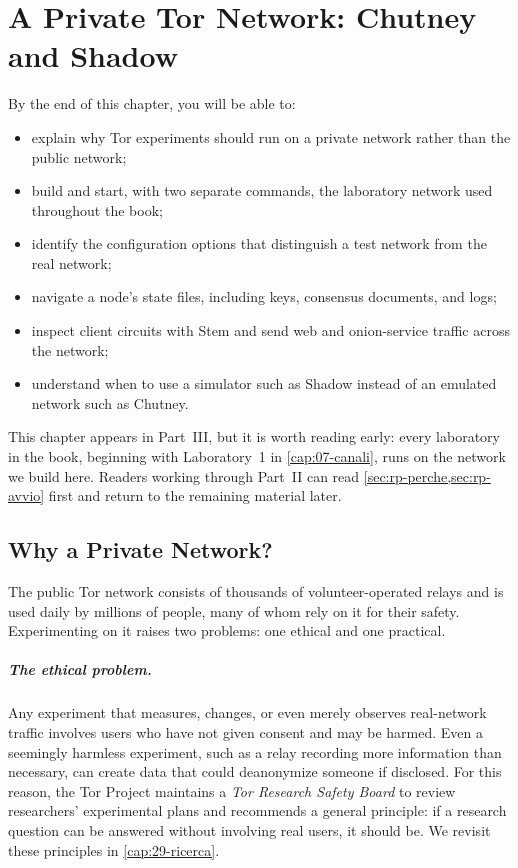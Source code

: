 \chapter{A Private Tor Network: Chutney and Shadow}\label{cap:19-rete-privata}

\begin{obiettivi}
By the end of this chapter, you will be able to:
\begin{itemize}[nosep]
  \item explain why Tor experiments should run on a private network rather than the public network;
  \item build and start, with two separate commands, the laboratory network used throughout the book;
  \item identify the configuration options that distinguish a test network from the real network;
  \item navigate a node's state files, including keys, consensus documents, and logs;
  \item inspect client circuits with Stem and send web and onion-service traffic across the network;
  \item understand when to use a simulator such as Shadow instead of an emulated network such as Chutney.
\end{itemize}
\end{obiettivi}

This chapter appears in Part~III, but it is worth reading early: every laboratory in the book, beginning with Laboratory~1 in \cref{cap:07-canali}, runs on the network we build here. Readers working through Part~II can read \cref{sec:rp-perche,sec:rp-avvio} first and return to the remaining material later.

\section{Why a Private Network?}\label{sec:rp-perche}

The public Tor network consists of thousands of volunteer-operated relays and is used daily by millions of people, many of whom rely on it for their safety. Experimenting on it raises two problems: one ethical and one practical.

\paragraph{The ethical problem.} Any experiment that measures, changes, or even merely observes real-network traffic involves users who have not given consent and may be harmed. Even a seemingly harmless experiment, such as a relay recording more information than necessary, can create data that could deanonymize someone if disclosed. For this reason, the Tor Project maintains a \emph{Tor Research Safety Board} to review researchers' experimental plans and recommends a general principle: if a research question can be answered without involving real users, it should be. We revisit these principles in \cref{cap:29-ricerca}.

